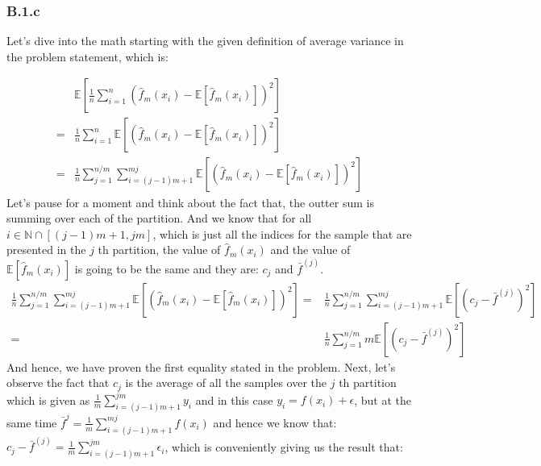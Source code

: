 \documentclass[]{article}
\begin{document}
	\subsubsection*{B.1.c}
		\hspace{1.1em}
		Let's dive into the math starting with the given definition of average variance in the problem statement, which is: 
		\par
		\begin{align*}\tag{B.1.c.1}\label{eqn:B.1.c.1}
			& \mathbb{E}\left[
				\frac{1}{n}
				\sum_{i = 1}^{n}\left(
					\hat{f}_m(x_i) - \mathbb{E}\left[\hat{f}_m(x_i)\right]
				\right)^2
			\right] 
			\\=& 
			\frac{1}{n}
			\sum_{i = 1}^{n}
			\mathbb{E}\left[
				\left(
					\hat{f}_m(x_i) - \mathbb{E}\left[\hat{f}_m(x_i)\right]
				\right)^2
			\right]
			\\
			=&
			\frac{1}{n}\sum_{j = 1}^{n/m}\sum_{i = (j - 1)m + 1}^{mj}
			\mathbb{E}\left[
				\left(
					\hat{f}_m(x_i) - \mathbb{E}\left[\hat{f}_m(x_i)\right]
				\right)^2
			\right]
		\end{align*}
		Let's pause for a moment and think about the fact that, the outter sum is summing over each of the partition. And we know that for all $i\in \mathbb{N}\cap[(j - 1)m + 1, jm]$, which is just all the indices for the sample that are presented in the $j$ th partition, the value of $\hat{f}_m(x_i)$ and the value of $\mathbb{E}\left[\hat{f}_m(x_i)\right]$ is going to be the same and they are: $c_j$ and $\bar{f}^{(j)}$. 
		\begin{align*}\tag{B.1.c.2}\label{eqn:B.1.c.2}
			\frac{1}{n}\sum_{j = 1}^{n/m}\sum_{i = (j - 1)m + 1}^{mj}
			\mathbb{E}\left[
				\left(
					\hat{f}_m(x_i) - \mathbb{E}\left[\hat{f}_m(x_i)\right]
				\right)^2
			\right] 
			= &
			\frac{1}{n}\sum_{j = 1}^{n/m}\sum_{i = (j - 1)m + 1}^{mj}
			\mathbb{E}\left[
				\left(
					c_j - \bar{f}^{(j)}
				\right)^2
			\right] 
			\\
			=& 
			\frac{1}{n}\sum_{j = 1}^{n/m}
				m\mathbb{E}\left[
					(c_j - \bar{f}^{(j)})^2
				\right] 
		\end{align*}
		And hence, we have proven the first equality stated in the problem. Next, let's observe the fact that $c_j$ is the average of all the samples over the $j$ th partition which is given as $\frac{1}{m}\sum_{i = (j - 1)m + 1}^{jm}y_i$ and in this case $y_i = f(x_i) + \epsilon$, but at the same time $\bar{f}^{j} = \frac{1}{m}\sum_{i = (j - 1)m + 1}^{mj}f(x_i)$ and hence we know that: $c_j - \bar{f}^{(j)} = \frac{1}{m}\sum_{i = (j - 1)m + 1}^{jm}\epsilon_i$, which is conveniently giving us the result that: 
\end{document}

